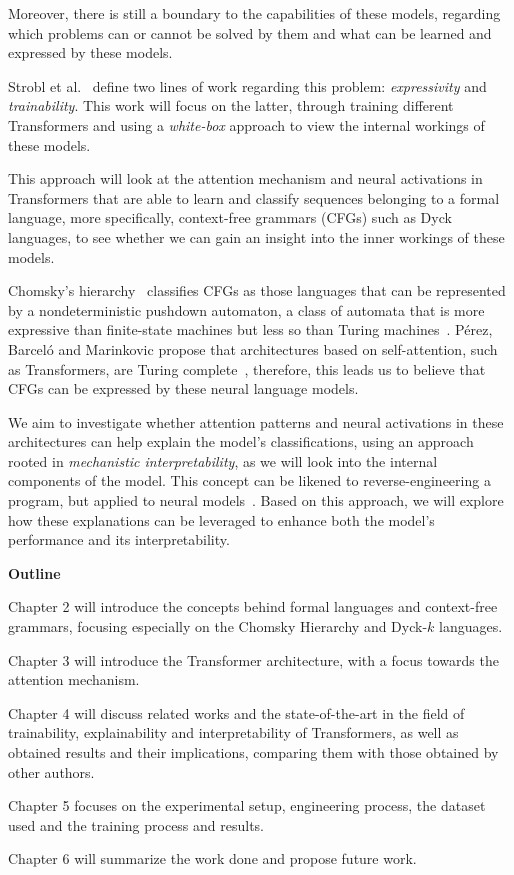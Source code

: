 Moreover, there is still a boundary to the capabilities of these models, regarding which problems can or cannot be solved by them and what can be learned and expressed by these models.

Strobl et al.~\cite{strobl2024formal} define two lines of work regarding this problem: \textit{expressivity} and \textit{trainability}. This work will focus on the latter, through training different Transformers and using a \textit{white-box} approach to view the internal workings of these models. 

This approach will look at the attention mechanism and neural activations in Transformers that are able to learn and classify sequences belonging to a formal language, more specifically, context-free grammars (CFGs) such as Dyck languages, to see whether we can gain an insight into the inner workings of these models.

Chomsky's hierarchy~\cite{chomsky-hierarchy} classifies CFGs as those languages that can be represented by a nondeterministic pushdown automaton, a class of automata that is more expressive than finite-state machines but less so than Turing machines~\cite{context-free-chomsky}. Pérez, Barceló and Marinkovic propose that architectures based on self-attention, such as Transformers, are Turing complete~\cite{attention-tc}, therefore, this leads us to believe that CFGs can be expressed by these neural language models.

We aim to investigate whether attention patterns and neural activations in these architectures can help explain the model's classifications, using an approach rooted in \emph{mechanistic interpretability}, as we will look into the internal components of the model. This concept can be likened to reverse-engineering a program, but applied to neural models~\cite{mech_interp, mech-interp-ai-safety}. Based on this approach, we will explore how these explanations can be leveraged to enhance both the model's performance and its interpretability.

\bigskip

\textbf{Outline}

Chapter 2 will introduce the concepts behind formal languages and context-free grammars, focusing especially on the Chomsky Hierarchy and Dyck-$k$ languages.

Chapter 3 will introduce the Transformer architecture, with a focus towards the attention mechanism.

Chapter 4 will discuss related works and the state-of-the-art in the field of trainability, explainability and interpretability of Transformers, as well as obtained results and their implications, comparing them with those obtained by other authors.

Chapter 5 focuses on the experimental setup, engineering process, the dataset used and the training process and results.

Chapter 6 will summarize the work done and propose future work.
